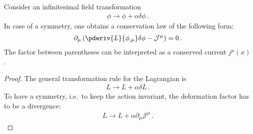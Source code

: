     \begin{theorem}\label{field:noethers_theorem}
        Consider an infinitesimal field transformation
        \begin{gather}
            \phi\longrightarrow\phi+\alpha\delta\phi\,.
        \end{gather}
        In case of a symmetry, one obtains a conservation law of the following form:
        \begin{gather}
            \label{field:conserved_current}
            \partial_\mu\left(\pderiv{L}{\phi_{,\mu}}\delta\phi - \mathcal{J}^\mu\right) = 0\,.
        \end{gather}
        The factor between parentheses can be interpreted as a conserved current $j^\mu(x)$.
        \begin{mdframed}[roundcorner=10pt, linecolor=blue, linewidth=1pt]
            \begin{proof}
                The general transformation rule for the Lagrangian is
                \begin{gather}
                    \label{noether_deriv:1}
                    L\longrightarrow L + \alpha\delta L\,.
                \end{gather}
                To have a symmetry, i.e.~to keep the action invariant, the deformation factor has to be a divergence:
                \begin{gather}
                    \label{noether_deriv:2}
                    L\longrightarrow L + \alpha\partial_\mu\mathcal{J}^\mu\,.
                \end{gather}


\end{proof}
\end{mdframed}
\end{theorem}
